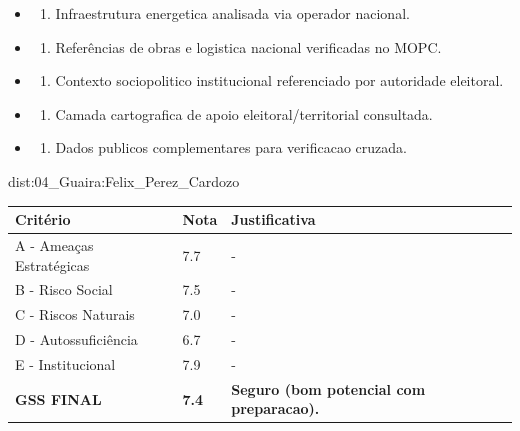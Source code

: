 {\begin{itemize}
\item
  \begin{enumerate}
  \def\labelenumi{\arabic{enumi})}
  \setcounter{enumi}{7}
  \tightlist
  \item
    Infraestrutura energetica analisada via operador nacional.
  \end{enumerate}
\item
  \begin{enumerate}
  \def\labelenumi{\arabic{enumi})}
  \setcounter{enumi}{8}
  \tightlist
  \item
    Referências de obras e logistica nacional verificadas no MOPC.
  \end{enumerate}
\item
  \begin{enumerate}
  \def\labelenumi{\arabic{enumi})}
  \setcounter{enumi}{9}
  \tightlist
  \item
    Contexto sociopolitico institucional referenciado por autoridade
    eleitoral.
  \end{enumerate}
\item
  \begin{enumerate}
  \def\labelenumi{\arabic{enumi})}
  \setcounter{enumi}{10}
  \tightlist
  \item
    Camada cartografica de apoio eleitoral/\allowbreak territorial consultada.
  \end{enumerate}
\item
  \begin{enumerate}
  \def\labelenumi{\arabic{enumi})}
  \setcounter{enumi}{11}
  \tightlist
  \item
    Dados publicos complementares para verificacao cruzada.
  \end{enumerate}
\end{itemize}}{dist:04_Guaira:Felix_Perez_Cardozo}
\begin{table}[ht!]
\small \begin{tabular}{p{3.0cm}p{0.8cm}p{6.0cm}} \toprule
\textbf{Critério} & \textbf{Nota} & \textbf{Justificativa} \\ \midrule
A - Ameaças Estratégicas & 7.7 & - \\
B - Risco Social & 7.5 & - \\
C - Riscos Naturais & 7.0 & - \\
D - Autossuficiência & 6.7 & - \\
E - Institucional & 7.9 & - \\
\midrule \textbf{GSS FINAL} & \textbf{7.4} & \textbf{Seguro (bom potencial com preparacao).} \\ \bottomrule \end{tabular}
\end{table}
